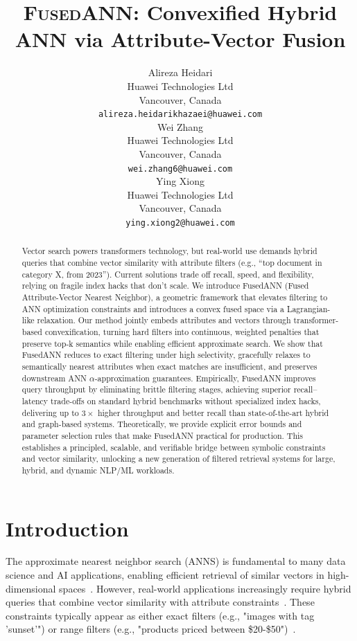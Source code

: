 \documentclass[numbers,sort]{article}
\title{\textsc{FusedANN}: Convexified Hybrid ANN via Attribute-Vector Fusion}
\author{
Alireza Heidari \\
  Huawei Technologies Ltd\\
  Vancouver, Canada \\
  \texttt{alireza.heidarikhazaei@huawei.com} \\
  \And
    Wei Zhang \\
      Huawei Technologies Ltd\\
      Vancouver, Canada \\
      \texttt{wei.zhang6@huawei.com} \\
  \And
    Ying Xiong \\
      Huawei Technologies Ltd\\
      Vancouver, Canada \\
      \texttt{ying.xiong2@huawei.com} 
}
\begin{document}
\maketitle


\begin{abstract}
Vector search powers transformers technology, but real-world use demands hybrid queries that combine vector similarity with attribute filters (e.g., “top document in category X, from 2023”). Current solutions trade off recall, speed, and flexibility, relying on fragile index hacks that don’t scale. We introduce FusedANN (Fused Attribute-Vector Nearest Neighbor), a geometric framework that elevates filtering to ANN optimization constraints and introduces a convex fused space via a Lagrangian-like relaxation. Our method jointly embeds attributes and vectors through transformer-based convexification, turning hard filters into continuous, weighted penalties that preserve top‑k semantics while enabling efficient approximate search. We show that FusedANN reduces to exact filtering under high selectivity, gracefully relaxes to semantically nearest attributes when exact matches are insufficient, and preserves downstream ANN $\alpha$-approximation guarantees. Empirically, FusedANN improves query throughput by eliminating brittle filtering stages, achieving superior recall–latency trade-offs on standard hybrid benchmarks without specialized index hacks, delivering up to $3\times$ higher throughput and better recall than state-of-the-art hybrid and graph-based systems. Theoretically, we provide explicit error bounds and parameter selection rules that make FusedANN practical for production. This establishes a principled, scalable, and verifiable bridge between symbolic constraints and vector similarity, unlocking a new generation of filtered retrieval systems for large, hybrid, and dynamic NLP/ML workloads.
\end{abstract}

\section{Introduction}
The approximate nearest neighbor search (ANNS) is fundamental to many data science and AI applications, enabling efficient retrieval of similar vectors in high-dimensional spaces~\cite{chen2021spann,malkov2018efficient,suhas2019diskann}. However, real-world applications increasingly require hybrid queries that combine vector similarity with attribute constraints~\cite{gollapudi2023filtered,wang2023efficient, wang2021milvus,wei2020analyticdb,taipalus-2024,pinecone,yahooNGT,hqann, MicrosoftSPTAG, doblix, UpLIF,fcvi}. These constraints typically appear as either exact filters (e.g., "images with tag 'sunset'") or range filters (e.g., "products priced between \$20-\$50")~\cite{pan2024survey,ren2020hm}.
\end{document}

